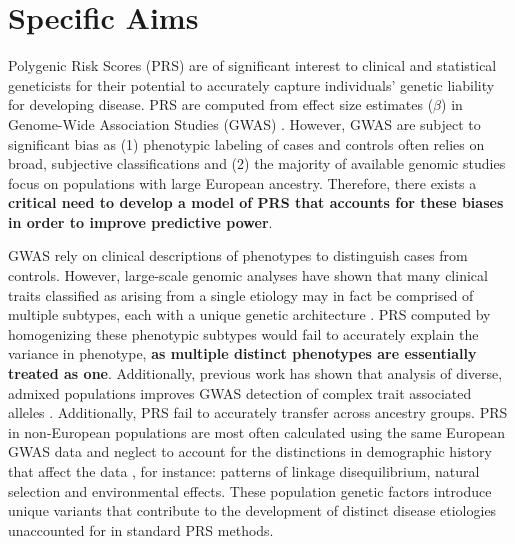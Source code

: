 \documentclass[11pt]{article}  %
\begin{document}
\pagestyle{empty}











\section*{Specific Aims}
\hspace{10mm}Polygenic Risk Scores (PRS) are of significant interest to clinical and statistical geneticists for their potential to accurately capture individuals' genetic liability for developing disease. PRS are computed from effect size estimates ($\beta$) in Genome-Wide Association Studies (GWAS) \cite{choi_tutorial_2020}. However, GWAS are subject to significant bias \cite{dudbridge_power_2013} as (1) phenotypic labeling of cases and controls often relies on broad, subjective classifications and (2) the majority of available genomic studies focus on populations with large European ancestry. Therefore, there exists a \textbf{critical need to develop a model of PRS that accounts for these biases in order to improve predictive power}.

\hspace{10mm}GWAS rely on clinical descriptions of phenotypes to distinguish cases from controls. However, large-scale genomic analyses have shown that many clinical traits classified as arising from a single etiology may in fact be comprised of multiple subtypes, each with a unique genetic architecture \cite{nicolau_topology_2011}. PRS computed by homogenizing these phenotypic subtypes would fail to accurately explain the variance in phenotype, \textbf{as multiple distinct phenotypes are essentially treated as one}. Additionally, previous work has shown that analysis of diverse, admixed populations improves GWAS detection of complex trait associated alleles \cite{wojcik_genetic_2019}. Additionally, PRS fail to accurately transfer across ancestry groups. PRS in non-European populations are most often calculated using the same European GWAS data and neglect to account for the distinctions in demographic history that affect the data \cite{wojcik_genetic_2019}, for instance: patterns of linkage disequilibrium, natural selection and environmental effects. These population genetic factors introduce unique variants that contribute to the development of distinct disease etiologies unaccounted for in standard PRS methods. 
\end{document}
